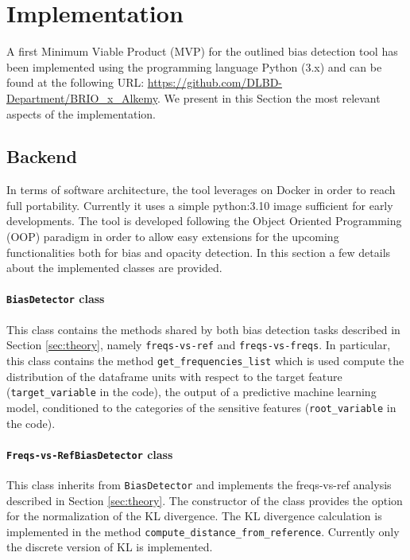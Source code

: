 \documentclass[
]{ceurart}
\begin{document}
\section{Implementation}
\label{sec:implementation}

A first Minimum Viable Product (MVP) for the outlined bias detection tool has been implemented using the programming language Python (3.x) and can be found at the following URL: \url{https://github.com/DLBD-Department/BRIO_x_Alkemy}. We present in this Section the most relevant aspects of the implementation.

\subsection{Backend}
\label{subsec:backend}

In terms of software architecture, the tool leverages on Docker in order to reach full portability. Currently it uses a simple python:3.10 image sufficient for early developments. The tool is developed following the Object Oriented Programming (OOP) paradigm in order to allow easy extensions for the upcoming functionalities both for bias and opacity detection. In this section a few details about the implemented classes are provided. 

\paragraph{\texttt{BiasDetector} class}

This class contains the methods shared by both bias detection tasks described in Section \ref{sec:theory}, namely \texttt{freqs-vs-ref} and \texttt{freqs-vs-freqs}. In particular, this class contains the method \texttt{get\_frequencies\_list} which is used compute the distribution of the dataframe units with respect to the target feature (\texttt{target\_variable} in the code), the output of a predictive machine learning model, conditioned to the categories of the sensitive features (\texttt{root\_variable} in the code). 

\paragraph{\texttt{Freqs-vs-RefBiasDetector} class}
This class inherits from \texttt{BiasDetector} and implements the freqs-vs-ref analysis described in Section \ref{sec:theory}. The constructor of the class provides the option for the normalization of the KL divergence. The KL divergence calculation is implemented in the method \texttt{compute\_distance\_from\_reference}. Currently only the discrete version of KL is implemented. 
\end{document}
